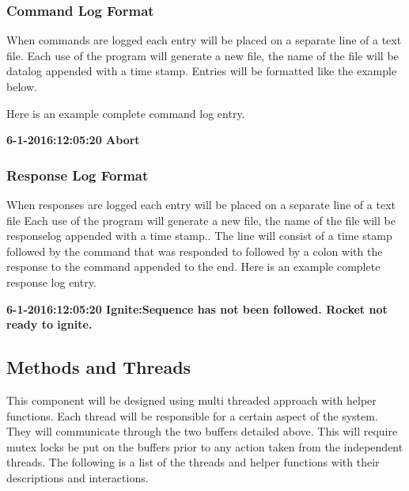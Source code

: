 \documentclass[10pt,draftclsnofoot,onecolumn,compsoc]{IEEEtran}
\begin{document}
\subsubsection{Command Log Format}
When commands are logged each entry will be placed on a separate line of a text file. Each use of the program will generate a new file, the name of the file will be datalog appended with a time stamp. Entries will be formatted like the example below. \par
Here is an example complete command log entry.\par
{\bf  6-1-2016:12:05:20 Abort}\par

\subsubsection{Response Log Format}
When responses are logged each entry will be placed on a separate line of a text file  Each use of the program will generate a new file, the name of the file will be responselog appended with a time stamp.. The line will consist of a time stamp followed by the command that was responded to followed by a colon with the response to the command appended to the end. Here is an example complete response log entry.\par
{\bf  6-1-2016:12:05:20 Ignite:Sequence has not been followed. Rocket not ready to ignite.}\par

\subsection{Methods and Threads}
This component will be designed using multi threaded approach with helper functions. Each thread will be responsible for a certain aspect of the system. They will communicate through the two buffers detailed above. This will require mutex locks be put on the buffers prior to any action taken from the independent threads. The following is a list of the threads and helper functions with their descriptions and interactions.
\end{document}
